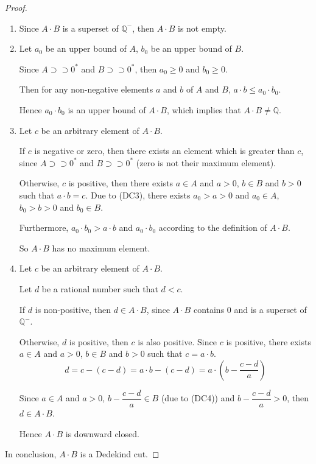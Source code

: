 \begin{proof}
    \begin{enumerate}[label = (\roman*)]
        \item Since $A\cdot B$ is a superset of $\mathbb{Q}^{-}$, then $A\cdot B$ is not empty.
        \item Let $a_{0}$ be an upper bound of $A$, $b_{0}$ be an upper bound of $B$.
              \par Since $A\supset\supset{0}^{*}$ and $B\supset\supset{0}^{*}$, then $a_{0}\ge 0$ and $b_{0}\ge 0$.
              \par Then for any non-negative elements $a$ and $b$ of $A$ and $B$, $a\cdot b \le a_{0}\cdot b_{0}$.
              \par Hence $a_{0}\cdot b_{0}$ is an upper bound of $A\cdot B$, which implies that $A\cdot B\ne\mathbb{Q}$.
        \item Let $c$ be an arbitrary element of $A\cdot B$.
              \par If $c$ is negative or zero, then there exists an element which is greater than $c$, since $A\supset\supset {0}^{*}$ and $B\supset\supset {0}^{*}$ (zero is not their maximum element).
              \par Otherwise, $c$ is positive, then there exists $a\in A$ and $a > 0$, $b\in B$ and $b > 0$ such that $a\cdot b = c$. Due to (DC3), there exists $a_{0} > a > 0$ and $a_{0}\in A$, $b_{0} > b > 0$ and $b_{0}\in B$.
              \par Furthermore, $a_{0}\cdot b_{0} > a\cdot b$ and $a_{0}\cdot b_{0}$ according to the definition of $A\cdot B$.
              \par So $A\cdot B$ has no maximum element.
        \item Let $c$ be an arbitrary element of $A\cdot B$.
              \par Let $d$ be a rational number such that $d < c$.
              \par If $d$ is non-positive, then $d\in A\cdot B$, since $A\cdot B$ contains $0$ and is a superset of $\mathbb{Q}^{-}$.
              \par Otherwise, $d$ is positive, then $c$ is also positive. Since $c$ is positive, there exists $a\in A$ and $a > 0$, $b\in B$ and $b > 0$ such that $c = a\cdot b$.
              \[
                  d = c - (c - d) = a\cdot b - (c - d) = a\cdot\left(b - \frac{c - d}{a}\right)
              \]
              \par Since $a\in A$ and $a > 0$, $b - \dfrac{c - d}{a}\in B$ (due to (DC4)) and $b - \dfrac{c - d}{a} > 0$, then $d \in A\cdot B$.
              \par Hence $A\cdot B$ is downward closed.
    \end{enumerate}
    \par In conclusion, $A\cdot B$ is a Dedekind cut.
\end{proof}

